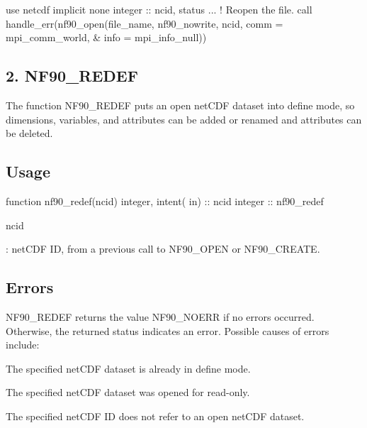 \begin{DoxyCode}
\textcolor{keywordtype}{use }netcdf
\textcolor{keywordtype}{implicit none}
\textcolor{keywordtype}{integer} :: ncid, status
...
 \textcolor{comment}{! Reopen the file.}
 \textcolor{keyword}{call }handle\_err(nf90\_open(file\_name, nf90\_nowrite, ncid, comm = mpi\_comm\_world, &
      info = mpi\_info\_null))
\end{DoxyCode}
\hypertarget{f90_datasets_f90-nf90_redef}{}\subsection{2. N\+F90\+\_\+\+R\+E\+D\+E\+F }\label{f90_datasets_f90-nf90_redef}
The function N\+F90\+\_\+\+R\+E\+D\+EF puts an open net\+C\+DF dataset into define mode, so dimensions, variables, and attributes can be added or renamed and attributes can be deleted.

\subsection*{Usage}


\begin{DoxyCode}
\textcolor{keyword}{function }nf90\_redef(ncid)
  \textcolor{keywordtype}{integer}, \textcolor{keywordtype}{intent( in)} :: ncid
  \textcolor{keywordtype}{integer}              :: nf90\_redef
\end{DoxyCode}


{\ttfamily ncid}

\+: net\+C\+DF ID, from a previous call to N\+F90\+\_\+\+O\+P\+EN or N\+F90\+\_\+\+C\+R\+E\+A\+TE.

\subsection*{Errors}

N\+F90\+\_\+\+R\+E\+D\+EF returns the value N\+F90\+\_\+\+N\+O\+E\+RR if no errors occurred. Otherwise, the returned status indicates an error. Possible causes of errors include\+:


\begin{DoxyItemize}
\item The specified net\+C\+DF dataset is already in define mode.
\item The specified net\+C\+DF dataset was opened for read-\/only.
\item The specified net\+C\+DF ID does not refer to an open net\+C\+DF dataset.
\end{DoxyItemize}

